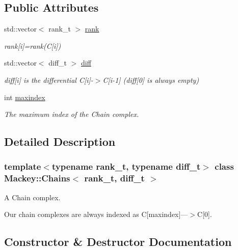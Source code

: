 \subsection*{Public Attributes}
\begin{DoxyCompactItemize}
\item 
std\+::vector$<$ rank\+\_\+t $>$ \hyperlink{classMackey_1_1Chains_ad041dff6f210ae5be4de0a3b076a4d95}{rank}
\begin{DoxyCompactList}\small\item\em rank\mbox{[}i\mbox{]}=rank(\+C\mbox{[}i\mbox{]}) \end{DoxyCompactList}\item 
std\+::vector$<$ diff\+\_\+t $>$ \hyperlink{classMackey_1_1Chains_a9ccee2cbb3daa1e82bab920aeef59516}{diff}
\begin{DoxyCompactList}\small\item\em diff\mbox{[}i\mbox{]} is the differential C\mbox{[}i\mbox{]}-\/$>$C\mbox{[}i-\/1\mbox{]} (diff\mbox{[}0\mbox{]} is always empty) \end{DoxyCompactList}\item 
int \hyperlink{classMackey_1_1Chains_a12a79cb031092cfd3473bb6512e7ae94}{maxindex}
\begin{DoxyCompactList}\small\item\em The maximum index of the Chain complex. \end{DoxyCompactList}\end{DoxyCompactItemize}


\subsection{Detailed Description}
\subsubsection*{template$<$typename rank\+\_\+t, typename diff\+\_\+t$>$\newline
class Mackey\+::\+Chains$<$ rank\+\_\+t, diff\+\_\+t $>$}

A Chain complex. 

Our chain complexes are always indexed as C\mbox{[}maxindex\mbox{]}---$>$C\mbox{[}0\mbox{]}. 

\subsection{Constructor \& Destructor Documentation}
\mbox{\label{classMackey_1_1Chains_ade226a800be59b53f1f1850e0753dbcb}} 
